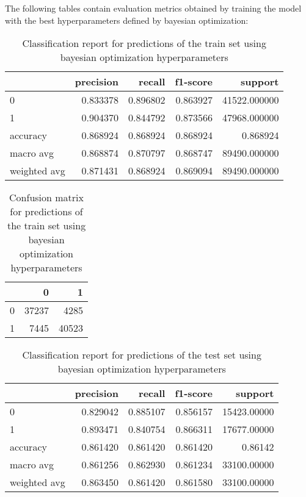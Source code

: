 \documentclass{article}
\begin{document}
{\begin{itemize}
The following tables contain evaluation metrics obtained by training the model with the best hyperparameters defined by bayesian optimization:

\begin{table}[h!]
\centering
\begin{tabular}{lrrrr}
\toprule
{} &  precision &    recall &  f1-score &       support \\
\midrule
0            &   0.833378 &  0.896802 &  0.863927 &  41522.000000 \\
1            &   0.904370 &  0.844792 &  0.873566 &  47968.000000 \\
accuracy     &   0.868924 &  0.868924 &  0.868924 &      0.868924 \\
macro avg    &   0.868874 &  0.870797 &  0.868747 &  89490.000000 \\
weighted avg &   0.871431 &  0.868924 &  0.869094 &  89490.000000 \\
\bottomrule
\end{tabular}
\caption{Classification report for predictions of the train set using bayesian optimization hyperparameters}
\label{table:model_tr_bo_cr}
\end{table}

\begin{table}[h!]
\centering

\begin{tabular}{lrr}
\toprule
{} &      0 &      1 \\
\midrule
0 &  37237 &   4285 \\
1 &   7445 &  40523 \\
\bottomrule
\end{tabular}
\caption{Confusion matrix for predictions of the train set using bayesian optimization hyperparameters}
\label{table:model_tr_bo_cm}
\end{table}

\begin{table}[h!]
\centering
\begin{tabular}{lrrrr}
\toprule
{} &  precision &    recall &  f1-score &      support \\
\midrule
0            &   0.829042 &  0.885107 &  0.856157 &  15423.00000 \\
1            &   0.893471 &  0.840754 &  0.866311 &  17677.00000 \\
accuracy     &   0.861420 &  0.861420 &  0.861420 &      0.86142 \\
macro avg    &   0.861256 &  0.862930 &  0.861234 &  33100.00000 \\
weighted avg &   0.863450 &  0.861420 &  0.861580 &  33100.00000 \\
\bottomrule
\end{tabular}
\caption{Classification report for predictions of the test set using bayesian optimization hyperparameters}
\label{table:model_te_bo_cr}
\end{table}
 

\end{itemize}}
\end{document}
